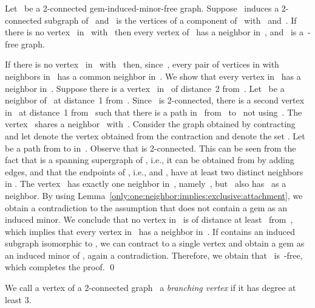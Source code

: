 \documentclass[envcountsame,envcountsect,11pt,a4paper]{llncs}
\renewenvironment{proof}{\begin{Proof}}{\qed\end{Proof}}
\begin{document}
\begin{lemma}
\label{lem:only:3:vertex:attached}
Let~ be a 2-connected gem-induced-minor-free graph.
Suppose~ induces a 2-connected subgraph of~
and~ is the vertices of a component of~ with~ and~.
If there is no vertex~ in~ with~ then every vertex of~ has a neighbor in~, and~ is a~-free graph.
\end{lemma}
\begin{proof}
If there is no vertex~ in~ with~
then, since~, every pair of vertices in  with neighbors in~ has a common neighbor in~. 
We show that every vertex in~ has a neighbor in~. Suppose there is a vertex~ in~ of distance~2 from~. Let~ be a neighbor
of~ at distance~1 from~. Since~ is 2-connected, there is a second vertex~ in~ at distance~1 from~ such that there is a
path in~ from~ to~ not using~.
The vertex~ shares a neighbor~ with~. 
Consider the graph  obtained by contracting~ and let  denote the vertex obtained from the contraction
and  denote the set .
Let~ be a path from  to  in~. Observe that  is 2-connected. This can be seen from the fact that  is a
spanning supergraph of , i.e., it can be obtained from  by adding edges, and that the endpoints of , i.e.,  and , have
at least two distinct neighbors in .
The vertex~ has exactly one neighbor in~, namely~, but~ also has~ as a neighbor.
By using Lemma~\ref{only:one:neighbor:implies:exclusive:attachment},
we obtain a contradiction to the assumption that  does not contain a gem as
an induced minor. We conclude that no vertex in~ is of distance at least~ from~, which implies that every vertex in~ has a
neighbor in~. If  contains an induced subgraph isomorphic to , we can contract  to a single vertex and obtain a gem as an
induced minor of , again a contradiction. Therefore, we obtain that~ is~-free, which completes the proof.
\end{proof}

We call a vertex of a 2-connected graph~ a \emph{branching vertex} if it has degree at least 3.
\end{document}
